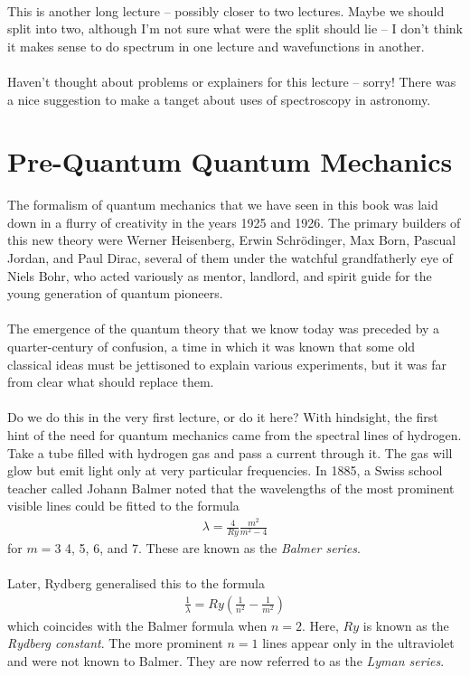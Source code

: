 \documentclass[12pt]{article}
\def\be{\begin{eqnarray}}
\def\ee{\end{eqnarray}}
\newcommand{\nn}{\nonumber}
\newcommand\para{\paragraph{}}
\newcommand{\cblue}{\color{blue}}
\newcommand{\cred}{\color{red}}
\begin{document}
{\para
{\cred This is another long lecture -- possibly closer to two lectures. Maybe we should split into two, although I'm not sure what were the split should lie -- I don't think it makes sense to do spectrum in one lecture and wavefunctions in another.}

\para
{\cblue Haven't thought about problems or explainers for this lecture -- sorry! There was a nice suggestion to make a tanget about uses of spectroscopy in astronomy. } 


\newpage
\section{Pre-Quantum Quantum Mechanics}


The formalism of quantum mechanics that we have seen in this book was laid down in  a flurry of creativity in the years 1925 and 1926. The primary builders of this new theory were Werner Heisenberg, Erwin Schr\"odinger, Max Born, Pascual Jordan, and Paul Dirac,  several of them  under the watchful grandfatherly eye of Niels Bohr, who acted variously as mentor, landlord, and spirit guide for the young generation of quantum pioneers.





\para
The emergence of the quantum theory that we know today was preceded by a quarter-century of confusion, a time in which it was known that some old classical ideas must be jettisoned to explain various experiments, but it was far from clear what should replace them.



\para {\cblue Do we do this in the very first lecture, or do it here?}
With hindsight, the first  hint of the need for  quantum mechanics came from the spectral lines of hydrogen. Take a tube filled with hydrogen gas and pass a current through it. The gas will glow but emit light only at very particular frequencies. In 1885, a Swiss school teacher called Johann Balmer noted that the wavelengths of the most prominent visible lines  could be fitted to the formula
%
\be \lambda = \frac{4}{Ry} \frac{m^2}{m^2-4}\nn \ee
%
for $m=3$ 4, 5, 6, and 7. These are known as  the {\it Balmer series}.

\para
Later, Rydberg generalised this to the formula
%
\be \frac{1}{\lambda} = Ry \left(\frac{1}{n^2} - \frac{1}{m^2}\right)\nn \ee
%
which coincides with the Balmer formula when $n=2$. Here, $Ry$ is known as the {\it Rydberg constant}. The more prominent $n=1$ lines appear only in the ultraviolet and were not known to Balmer. They are now referred to as the {\it Lyman series}.

}
\end{document}
